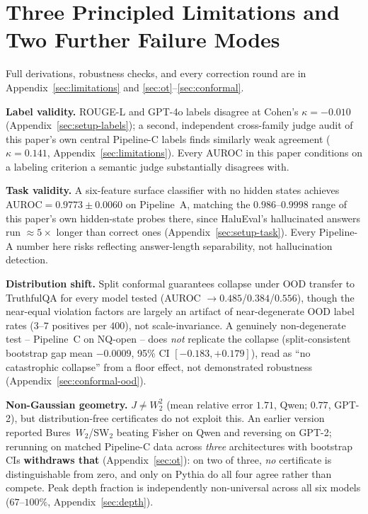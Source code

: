 \documentclass[onecolumn]{jmlr}
\begin{document}
\section{Three Principled Limitations and Two Further Failure Modes}
\label{sec:limitations-compact}

Full derivations, robustness checks, and every correction round are in
Appendix~\ref{sec:limitations} and \ref{sec:ot}--\ref{sec:conformal}.

\textbf{Label validity.} ROUGE-L and GPT-4o labels disagree at Cohen's
$\kappa=-0.010$ (Appendix~\ref{sec:setup-labels}); a second, independent
cross-family judge audit of this paper's own central Pipeline-C labels
finds similarly weak agreement ($\kappa=0.141$, Appendix~\ref{sec:limitations}).
Every AUROC in this paper conditions on a labeling criterion a semantic
judge substantially disagrees with.

\textbf{Task validity.} A six-feature surface classifier with no hidden
states achieves AUROC$=0.9773\pm0.0060$ on Pipeline~A, matching the
$0.986$--$0.9998$ range of this paper's own hidden-state probes there, since
HaluEval's hallucinated answers run ${\approx}5\times$ longer than correct
ones (Appendix~\ref{sec:setup-task}). Every Pipeline-A number here risks
reflecting answer-length separability, not hallucination detection.

\textbf{Distribution shift.} Split conformal guarantees collapse under OOD
transfer to TruthfulQA for every model tested (AUROC $\to
0.485$/$0.384$/$0.556$), though the near-equal violation factors are largely an
artifact of near-degenerate OOD label rates ($3$--$7$ positives per $400$), not
scale-invariance. A genuinely non-degenerate test -- Pipeline~C on NQ-open --
does \emph{not} replicate the collapse (split-consistent bootstrap gap mean
$-0.0009$, 95\% CI $[-0.183,+0.179]$), read as ``no catastrophic collapse''
from a floor effect, not demonstrated robustness
(Appendix~\ref{sec:conformal-ood}).

\textbf{Non-Gaussian geometry.} $J \neq W_2^2$ (mean relative error
$1.71$, Qwen; $0.77$, GPT-2), but distribution-free certificates do not
exploit this. An earlier version reported Bures~$W_2$/SW$_2$ beating Fisher on Qwen and
reversing on GPT-2; rerunning on matched Pipeline-C data across
\emph{three} architectures with bootstrap CIs \textbf{withdraws that}
(Appendix~\ref{sec:ot}): on two of three, \emph{no} certificate is
distinguishable from zero, and only on Pythia do all four agree rather
than compete.
Peak depth fraction is independently non-universal across all six models
($67$--$100\%$, Appendix~\ref{sec:depth}).
\end{document}
